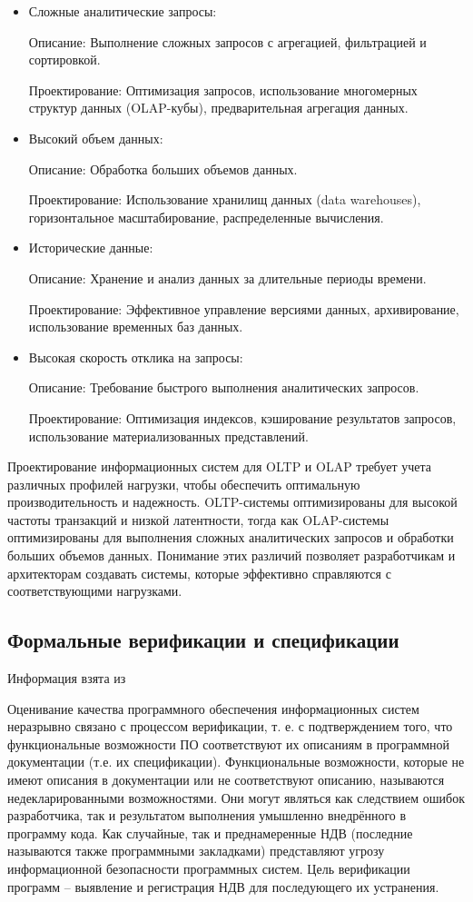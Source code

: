 \begin{itemize}
	
	\item Сложные аналитические запросы:

	Описание: Выполнение сложных запросов с агрегацией, фильтрацией и сортировкой.
	
	Проектирование: Оптимизация запросов, использование многомерных структур данных (OLAP-кубы), предварительная агрегация данных.
	
	\item Высокий объем данных:

	Описание: Обработка больших объемов данных.
	
	Проектирование: Использование хранилищ данных (data warehouses), горизонтальное масштабирование, распределенные вычисления.
	
	\item Исторические данные:

	Описание: Хранение и анализ данных за длительные периоды времени.
	
	Проектирование: Эффективное управление версиями данных, архивирование, использование временных баз данных.
	
	\item Высокая скорость отклика на запросы:

	Описание: Требование быстрого выполнения аналитических запросов.
	
	Проектирование: Оптимизация индексов, кэширование результатов запросов, использование материализованных представлений.
\end{itemize}

Проектирование информационных систем для OLTP и OLAP требует учета различных профилей нагрузки, чтобы обеспечить оптимальную производительность и надежность. OLTP-системы оптимизированы для высокой частоты транзакций и низкой латентности, тогда как OLAP-системы оптимизированы для выполнения сложных аналитических запросов и обработки больших объемов данных. Понимание этих различий позволяет разработчикам и архитекторам создавать системы, которые эффективно справляются с соответствующими нагрузками.

\subsection{Формальные верификации и спецификации}
Информация взята из \autocite{Glukharev}

Оценивание качества программного обеспечения информационных систем неразрывно связано с процессом верификации,
т. е. с подтверждением того, что функциональные возможности ПО соответствуют их описаниям в программной документации
(т.е. их спецификации). Функциональные возможности, которые не имеют описания в документации или не соответствуют
описанию, называются недекларированными возможностями. Они могут являться как следствием ошибок разработчика,
так и результатом выполнения умышленно внедрённого в программу кода. Как случайные, так и преднамеренные НДВ
(последние называются также программными закладками) представляют угрозу информационной безопасности программных
систем. Цель верификации программ – выявление и регистрация НДВ для последующего их устранения.


